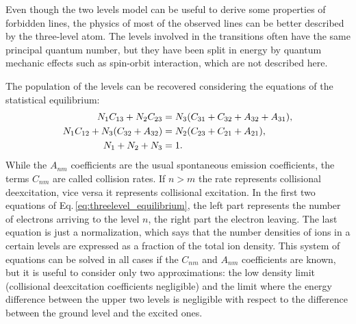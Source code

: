 \documentclass[../main.tex]{subfiles}
\begin{document}
Even though the two levels model can be useful to derive some properties of forbidden lines, the physics of most of the observed lines can be better described by the three-level atom.
The levels involved in the transitions often have the same principal quantum number, but they have been split in energy by quantum mechanic effects such as spin-orbit interaction, which are not described here.

The population of the levels can be recovered considering the equations of the statistical equilibrium:
\begin{align}
    \label{eq:threelevel_equilibrium}
    N_1 C_{13}+N_2 C_{23} &= N_3(C_{31}+C_{32}+A_{32}+A_{31}), \notag\\
    N_1 C_{12}+N_3(C_{32}+A_{32}) &= N_2(C_{23}+C_{21}+A_{21}),\\
    N_1+N_2+N_3 &= 1. \notag
\end{align}
While the $A_{nm}$ coefficients are the usual spontaneous emission coefficients, the terms $C_{nm}$ are called collision rates.
If $n>m$ the rate represents collisional deexcitation, vice versa it represents collisional excitation.
In the first two equations of Eq.\,\ref{eq:threelevel_equilibrium}, the left part represents the number of electrons arriving to the level $n$, the right part the electron leaving.
The last equation is just a normalization, which says that the number densities of ions in a certain levels are expressed as a fraction of the total ion density.
This system of equations can be solved in all cases if the $C_{nm}$ and $A_{nm}$ coefficients are known, but it is useful to consider only two approximations: the low density limit (collisional deexcitation coefficients negligible) and the limit where the energy difference between the upper two levels is negligible with respect to the difference between the ground level and the excited ones.
\end{document}
